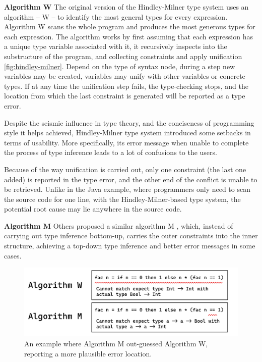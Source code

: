 \textbf{Algorithm W} The original version of the Hindley-Milner type system uses an algorithm -- W -- to identify the most general types for every expression. Algorithm W scans the whole program and produces the most generous types for each expression. The algorithm works by first assuming that each expression has a unique type variable associated with it,  it recursively inspects into the substructure of the program, and collecting constraints and apply unification \ref{fig:hindley-milner}. Depend on the type of syntax node, during a step new variables may be created, variables may unify with other variables or concrete types. If at any time the unification step fails, the type-checking stops, and the location from which the last constraint is generated will be reported as a type error.


Despite the seismic influence in type theory, and the conciseness of programming style it helps achieved,  Hindley-Milner type system introduced some setbacks in terms of usability. More specifically, its error message when unable to complete the process of type inference leads to a lot of confusions to the users. 

Because of the way unification is carried out, only one constraint (the last one added) is reported in the type error, and the other end of the conflict is unable to be retrieved. Unlike in the Java example, where programmers only need to scan the source code for one line, with the Hindley-Milner-based type system, the potential root cause may lie anywhere in the source code.

\textbf{Algorithm M} 
Others proposed a similar algorithm M \cite{Lee1998-fx}, which, instead of carrying out type inference bottom-up, carries the outer constraints into the inner structure, achieving a top-down type inference and better error messages in some cases. 

\begin{figure}[hbt]
  \includegraphics[width=0.8\linewidth]{AlgorithmWM1.pdf}
  \caption{
    \label{fig:algorithm-m-1}
      An example where Algorithm M out-guessed Algorithm W, reporting a more plausible error location.}
\end{figure}


